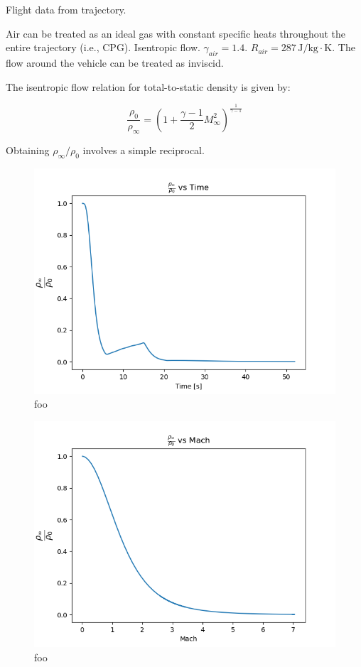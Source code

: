 \documentclass[../main.tex]{subfiles}
\begin{document}
\givens{}
Flight data from trajectory.

\assumptions{}
Air can be treated as an ideal gas with constant specific heats throughout the entire trajectory (i.e., CPG).
Isentropic flow.
\(\gamma_{air} = 1.4\). 
\(R_{air} = 287 \, \unit{\joule/\kilogram\cdot\kelvin}\). 
The flow around the vehicle can be treated as inviscid.

\solution{}

The isentropic flow relation for total-to-static density is given by:

\[
    \frac{\rho_0}{\rho_\infty} = \left({1 + \frac{\gamma-1}{2} M_\infty^2}\right) ^ {\frac{1}{\gamma-1}}   
\]

Obtaining \(\rho_\infty/\rho_0\) involves a simple reciprocal.

\begin{figure}[h]
    \centering
    \includegraphics[scale=.7]{../../images/problem_1/rho_rho_t_vs_Time.png}
    \caption{foo}
    \label{rho_rho_t_time}
\end{figure}

\begin{figure}[h]
    \centering
    \includegraphics[scale=.7]{../../images/problem_1/rho_rho_t_vs_Mach.png}
    \caption{foo}
    \label{rho_rho_t_vs_Mach}
\end{figure}
\end{document}
